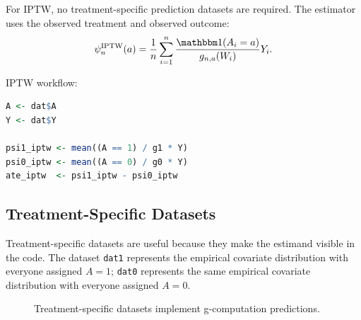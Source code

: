 For IPTW, no treatment-specific prediction datasets are required. The estimator uses
the observed treatment and observed outcome:
\[
\psi_n^{\IPTW}(a)=
\frac{1}{n}\sum_{i=1}^n
\frac{\ind(A_i=a)}{g_{n,a}(W_i)}Y_i.
\]

\begin{implementationbox}
IPTW workflow:
\begin{lstlisting}[language=R]
A <- dat$A
Y <- dat$Y

psi1_iptw <- mean((A == 1) / g1 * Y)
psi0_iptw <- mean((A == 0) / g0 * Y)
ate_iptw  <- psi1_iptw - psi0_iptw
\end{lstlisting}
\end{implementationbox}

\subsection{Treatment-Specific Datasets}

Treatment-specific datasets are useful because they make the estimand visible in the
code. The dataset \texttt{dat1} represents the empirical covariate distribution with
everyone assigned $A=1$; \texttt{dat0} represents the same empirical covariate
distribution with everyone assigned $A=0$.

\begin{figure}[H]
\centering
{}
\caption{Treatment-specific datasets implement g-computation predictions.}
\label{fig:ch4-treatment-specific-data}
\end{figure}

